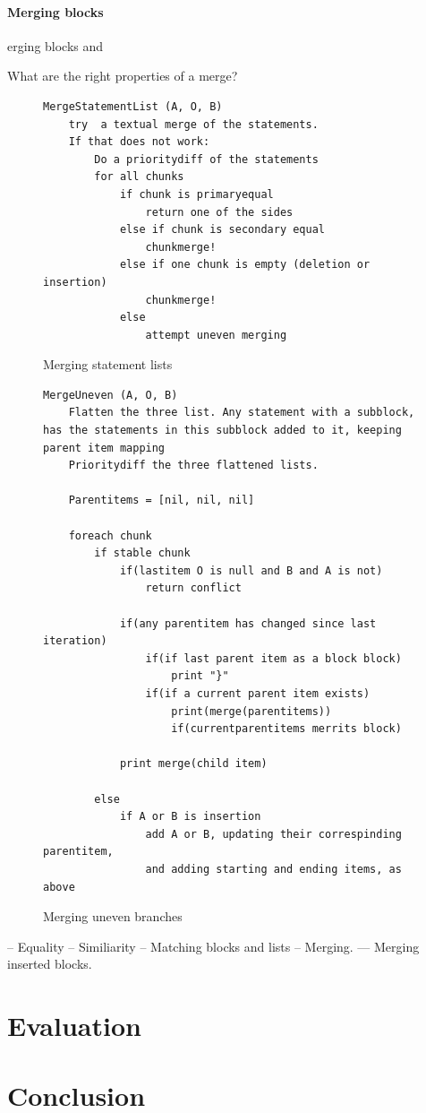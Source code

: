 \documentclass[11pt]{article}
\begin{document}
\paragraph{Merging blocks}
erging blocks and 


What are the right properties of a merge?

\begin{figure}
  \caption{Merging statement lists}
  \label{MergeStatementList}
\begin{verbatim}
MergeStatementList (A, O, B)
    try  a textual merge of the statements.
    If that does not work:
        Do a prioritydiff of the statements
        for all chunks
            if chunk is primaryequal
                return one of the sides
            else if chunk is secondary equal
                chunkmerge!
            else if one chunk is empty (deletion or insertion)
                chunkmerge!
            else 
                attempt uneven merging

\end{verbatim}
\end{figure}

\begin{figure}
  \caption{Merging uneven branches}
  \label{MergeToken}
\begin{verbatim}
MergeUneven (A, O, B)
    Flatten the three list. Any statement with a subblock, has the statements in this subblock added to it, keeping parent item mapping
    Prioritydiff the three flattened lists.

    Parentitems = [nil, nil, nil]

    foreach chunk
        if stable chunk
            if(lastitem O is null and B and A is not)
                return conflict

            if(any parentitem has changed since last iteration)
                if(if last parent item as a block block)
                    print "}"
                if(if a current parent item exists)
                    print(merge(parentitems))
                    if(currentparentitems merrits block)
            
            print merge(child item)

        else 
            if A or B is insertion
                add A or B, updating their correspinding parentitem,
                and adding starting and ending items, as above
\end{verbatim}
\end{figure}


-- Equality
-- Similiarity
-- Matching blocks and lists
-- Merging.
--- Merging inserted blocks.

\clearpage
\section{Evaluation}

\clearpage
\section{Conclusion}

\clearpage



\end{document}
